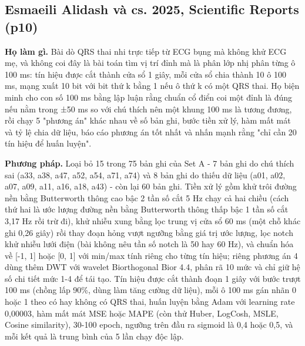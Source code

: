 \documentclass[12pt,a4paper]{article}
\begin{document}
\subsection{Esmaeili Alidash và cs. 2025, Scientific Reports \normalfont\small (p10)}
\par\vspace{2pt}
\par\vspace{4pt}
\noindent \textbf{Họ làm gì.} Bài dò QRS thai nhi trực tiếp từ ECG bụng mà không khử ECG mẹ, và không coi đây là bài toán tìm vị trí đỉnh mà là phân lớp nhị phân từng ô 100 ms: tín hiệu được cắt thành cửa sổ 1 giây, mỗi cửa sổ chia thành 10 ô 100 ms, mạng xuất 10 bit với bit thứ k bằng 1 nếu ô thứ k có một QRS thai. Họ biện minh cho con số 100 ms bằng lập luận rằng chuẩn cổ điển coi một đỉnh là đúng nếu nằm trong ±50 ms so với chú thích nên một khung 100 ms là tương đương, rồi chạy 5 "phương án" khác nhau về số bản ghi, bước tiền xử lý, hàm mất mát và tỷ lệ chia dữ liệu, báo cáo phương án tốt nhất và nhấn mạnh rằng "chỉ cần 20 tín hiệu để huấn luyện".\par\vspace{3pt}
\noindent \textbf{Phương pháp.} Loại bỏ 15 trong 75 bản ghi của Set A - 7 bản ghi do chú thích sai (a33, a38, a47, a52, a54, a71, a74) và 8 bản ghi do thiếu dữ liệu (a01, a02, a07, a09, a11, a16, a18, a43) - còn lại 60 bản ghi. Tiền xử lý gồm khử trôi đường nền bằng Butterworth thông cao bậc 2 tần số cắt 5 Hz chạy cả hai chiều (cách thứ hai là ước lượng đường nền bằng Butterworth thông thấp bậc 1 tần số cắt 3,17 Hz rồi trừ đi), khử nhiễu xung bằng lọc trung vị cửa sổ 60 ms (một chỗ khác ghi 0,26 giây) rồi thay đoạn hỏng vượt ngưỡng bằng giá trị ước lượng, lọc notch khử nhiễu lưới điện (bài không nêu tần số notch là 50 hay 60 Hz), và chuẩn hóa về [-1, 1] hoặc [0, 1] với min/max tính riêng cho từng tín hiệu; riêng phương án 4 dùng thêm DWT với wavelet Biorthogonal Bior 4.4, phân rã 10 mức và chỉ giữ hệ số chi tiết mức 1-4 để tái tạo. Tín hiệu được cắt thành đoạn 1 giây với bước trượt 100 ms (chồng lấp 90\%, dùng làm tăng cường dữ liệu), mỗi ô 100 ms gán nhãn 0 hoặc 1 theo có hay không có QRS thai, huấn luyện bằng Adam với learning rate 0,00003, hàm mất mát MSE hoặc MAPE (còn thử Huber, LogCosh, MSLE, Cosine similarity), 30-100 epoch, ngưỡng trên đầu ra sigmoid là 0,4 hoặc 0,5, và mỗi kết quả là trung bình của 5 lần chạy độc lập.\par\vspace{3pt}
\end{document}
